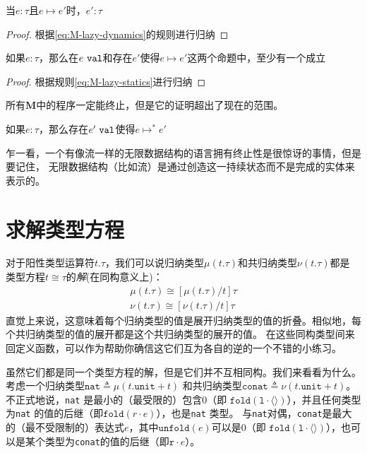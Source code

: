 \begin{lemma}
	当$e:\tau$且$e\mapsto e'$时，$e':\tau$
\end{lemma}

\begin{proof}
	根据\ref{eq:M-lazy-dynamics}的规则进行归纳
\end{proof}

\begin{lemma}
	如果$e:\tau$，那么在$e\ \normalfont\texttt{val}$和存在$e'$使得$e\mapsto e'$这两个命题中，至少有一个成立
\end{lemma}

\begin{proof}
	根据规则\ref{eq:M-lazy-statics}进行归纳
\end{proof}

所有$\textbf{M}$中的程序一定能终止，但是它的证明超出了现在的范围。

\begin{theorem}
	如果$e:\tau$，那么存在$e'\ \normalfont\texttt{val}$使得$e\mapsto^*e'$
\end{theorem}

乍一看，一个有像流一样的无限数据结构的语言拥有终止性是很惊讶的事情，但是要记住，
无限数据结构（比如流）是通过创造这一持续状态而不是完成的实体来表示的。

\section{求解类型方程}

\noindent 对于阳性类型运算符$t.\tau$，我们可以说归纳类型$\mu(t.\tau)$和共归纳类型$\nu(t.\tau)$都是
类型方程$t\cong\tau$的\textit{解}(在同构意义上)：
\begin{subequations}
	\begin{gather*}
	\mu(t.\tau)\cong[\mu(t.\tau)/t]\tau \\
	\nu(t.\tau)\cong[\nu(t.\tau)/t]\tau
	\end{gather*}
\end{subequations}
直觉上来说，这意味着每个归纳类型的值是展开归纳类型的值的折叠。相似地，每个共归纳类型的值的展开都是这个共归纳类型的展开的值。
在这些同构类型间来回定义函数，可以作为帮助你确信这它们互为各自的逆的一个不错的小练习。

虽然它们都是同一个类型方程的解，但是它们并不互相同构。我们来看看为什么。考虑一个归纳类型$\texttt{nat}\triangleq\mu(t.\texttt{unit}+t)$
和共归纳类型$\texttt{conat}\triangleq\nu(t.\texttt{unit}+t)$。不正式地说，\texttt{nat} 是最小的（最受限的）包含0（即
$\texttt{fold}(\texttt{l}\cdot\langle\rangle)$），并且任何类型为\texttt{nat} 的值的后继（即$\texttt{fold}(r\cdot e)$），也是\texttt{nat} 类型。
与\texttt{nat}对偶，\texttt{conat}是最大的（最不受限制的）表达式$e$，其中$\texttt{unfold}(e)$可以是0（即
$\texttt{fold}(\texttt{l}\cdot\langle\rangle)$），也可以是某个类型为\texttt{conat}的值的后继（即$\texttt{r}\cdot e$）。


